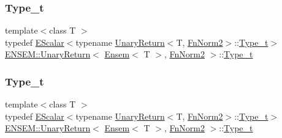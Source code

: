 \subsubsection{\texorpdfstring{Type\_t}{Type\_t}\hspace{0.1cm}{\footnotesize\ttfamily [1/3]}}
{\footnotesize\ttfamily template$<$class T $>$ \\
typedef \mbox{\hyperlink{classENSEM_1_1EScalar}{E\+Scalar}}$<$typename \mbox{\hyperlink{structENSEM_1_1UnaryReturn}{Unary\+Return}}$<$T, \mbox{\hyperlink{structENSEM_1_1FnNorm2}{Fn\+Norm2}}$>$\+::\mbox{\hyperlink{structENSEM_1_1UnaryReturn_3_01Ensem_3_01T_01_4_00_01FnNorm2_01_4_ab4124c6816741e910b729ef32c1a9c37}{Type\+\_\+t}}$>$ \mbox{\hyperlink{structENSEM_1_1UnaryReturn}{E\+N\+S\+E\+M\+::\+Unary\+Return}}$<$ \mbox{\hyperlink{classENSEM_1_1Ensem}{Ensem}}$<$ T $>$, \mbox{\hyperlink{structENSEM_1_1FnNorm2}{Fn\+Norm2}} $>$\+::\mbox{\hyperlink{structENSEM_1_1UnaryReturn_3_01Ensem_3_01T_01_4_00_01FnNorm2_01_4_ab4124c6816741e910b729ef32c1a9c37}{Type\+\_\+t}}}

\mbox{\label{structENSEM_1_1UnaryReturn_3_01Ensem_3_01T_01_4_00_01FnNorm2_01_4_ab4124c6816741e910b729ef32c1a9c37}} 
\subsubsection{\texorpdfstring{Type\_t}{Type\_t}\hspace{0.1cm}{\footnotesize\ttfamily [2/3]}}
{\footnotesize\ttfamily template$<$class T $>$ \\
typedef \mbox{\hyperlink{classENSEM_1_1EScalar}{E\+Scalar}}$<$typename \mbox{\hyperlink{structENSEM_1_1UnaryReturn}{Unary\+Return}}$<$T, \mbox{\hyperlink{structENSEM_1_1FnNorm2}{Fn\+Norm2}}$>$\+::\mbox{\hyperlink{structENSEM_1_1UnaryReturn_3_01Ensem_3_01T_01_4_00_01FnNorm2_01_4_ab4124c6816741e910b729ef32c1a9c37}{Type\+\_\+t}}$>$ \mbox{\hyperlink{structENSEM_1_1UnaryReturn}{E\+N\+S\+E\+M\+::\+Unary\+Return}}$<$ \mbox{\hyperlink{classENSEM_1_1Ensem}{Ensem}}$<$ T $>$, \mbox{\hyperlink{structENSEM_1_1FnNorm2}{Fn\+Norm2}} $>$\+::\mbox{\hyperlink{structENSEM_1_1UnaryReturn_3_01Ensem_3_01T_01_4_00_01FnNorm2_01_4_ab4124c6816741e910b729ef32c1a9c37}{Type\+\_\+t}}}

